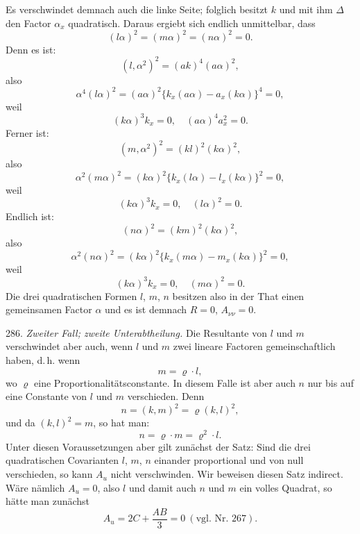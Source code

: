 \documentclass[11pt]{article}
\providecommand{\weberpage}[1]{}
\providecommand{\weq}[2]{\begin{equation}\tag{#1}#2\end{equation}}
\begin{document}
\weberpage{310}

Es verschwindet demnach auch die linke Seite; folglich besitzt $k$ und mit ihm $\varDelta$ den Factor $\alpha_x$ quadratisch. Daraus ergiebt sich endlich unmittelbar, dass
\[
(l\alpha)^2=(m\alpha)^2=(n\alpha)^2=0.
\]
Denn es ist:
\[
(l,\alpha^2)^2=(ak)^4(a\alpha)^2,
\]
also
\[
\alpha^4(l\alpha)^2=(a\alpha)^2\{k_x(a\alpha)-a_x(k\alpha)\}^4=0,
\]
weil
\[
(k\alpha)^3k_x=0,\quad (a\alpha)^4a_x^2=0.
\]
Ferner ist:
\[
(m,\alpha^2)^2=(kl)^2(k\alpha)^2,
\]
also
\[
\alpha^2(m\alpha)^2=(k\alpha)^2\{k_x(l\alpha)-l_x(k\alpha)\}^2=0,
\]
weil
\[
(k\alpha)^3k_x=0,\quad (l\alpha)^2=0.
\]
Endlich ist:
\[
(n\alpha)^2=(km)^2(k\alpha)^2,
\]
also
\[
\alpha^2(n\alpha)^2=(k\alpha)^2\{k_x(m\alpha)-m_x(k\alpha)\}^2=0,
\]
weil
\[
(k\alpha)^3k_x=0,\quad (m\alpha)^2=0.
\]
Die drei quadratischen Formen $l$, $m$, $n$ besitzen also in der That einen gemeinsamen Factor $\alpha$ und es ist demnach $R=0$, $A_{\nu\nu}=0$.

286. \textit{Zweiter Fall; zweite Unterabtheilung.} Die Resultante von $l$ und $m$ verschwindet aber auch, wenn $l$ und $m$ zwei lineare Factoren gemeinschaftlich haben, d.\,h. wenn
\weq{1}{m=\varrho\cdot l,}
wo $\varrho$ eine Proportionalitätsconstante. In diesem Falle ist aber auch $n$ nur bis auf eine Constante von $l$ und $m$ verschieden. Denn
\[
n=(k,m)^2=\varrho(k,l)^2,
\]
und da $(k,l)^2=m$, so hat man:
\[
n=\varrho\cdot m=\varrho^2\cdot l.
\]
Unter diesen Voraussetzungen aber gilt zunächst der Satz:
\glqq Sind die drei quadratischen Covarianten $l$, $m$, $n$ einander proportional und von null verschieden, so kann $A_u$ nicht verschwinden.\grqq{}
Wir beweisen diesen Satz indirect. Wäre nämlich $A_u=0$, also $l$ und damit auch $n$ und $m$ ein volles Quadrat, so hätte man zunächst
\weq{2}{A_u=2C+\frac{AB}{3}=0\ (\text{vgl.\ Nr.\ 267}).}


\weberpage{311}
\end{document}
